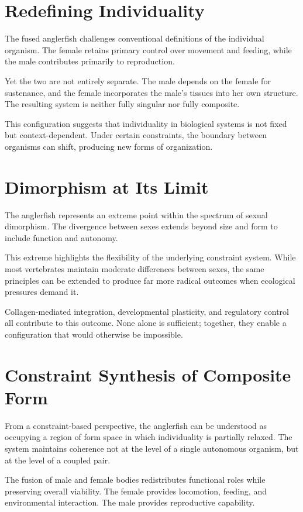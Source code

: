 \documentclass[11pt,oneside]{book}
\begin{document}
\section{Redefining Individuality}

The fused anglerfish challenges conventional definitions of the individual organism. The female retains primary control over movement and feeding, while the male contributes primarily to reproduction.

Yet the two are not entirely separate. The male depends on the female for sustenance, and the female incorporates the male’s tissues into her own structure. The resulting system is neither fully singular nor fully composite.

This configuration suggests that individuality in biological systems is not fixed but context-dependent. Under certain constraints, the boundary between organisms can shift, producing new forms of organization.

\section{Dimorphism at Its Limit}

The anglerfish represents an extreme point within the spectrum of sexual dimorphism. The divergence between sexes extends beyond size and form to include function and autonomy.

This extreme highlights the flexibility of the underlying constraint system. While most vertebrates maintain moderate differences between sexes, the same principles can be extended to produce far more radical outcomes when ecological pressures demand it.

Collagen-mediated integration, developmental plasticity, and regulatory control all contribute to this outcome. None alone is sufficient; together, they enable a configuration that would otherwise be impossible.

\section{Constraint Synthesis of Composite Form}

From a constraint-based perspective, the anglerfish can be understood as occupying a region of form space in which individuality is partially relaxed. The system maintains coherence not at the level of a single autonomous organism, but at the level of a coupled pair.

The fusion of male and female bodies redistributes functional roles while preserving overall viability. The female provides locomotion, feeding, and environmental interaction. The male provides reproductive capability.
\end{document}
